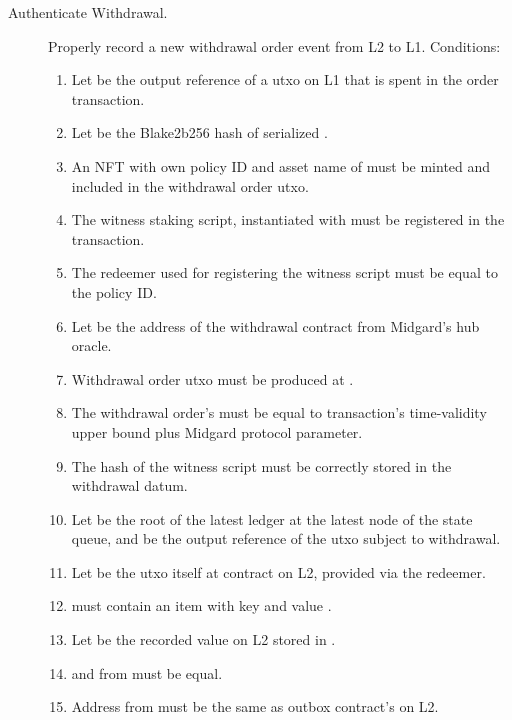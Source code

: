 \documentclass[../midgard.tex]{subfiles}
\begin{document}
\begin{description}
  \item[Authenticate Withdrawal.] Properly record a new withdrawal order event from L2 to L1.
    Conditions:
      \begin{enumerate}
        \item Let  be the output reference of a utxo on L1 that is spent in the order transaction.
        \item Let  be the Blake2b256 hash of serialized .
        \item An NFT with own policy ID and asset name of  must be minted and included in the withdrawal order utxo.
        \item The witness staking script, instantiated with  must be registered in the transaction.
        \item The redeemer used for registering the witness script must be equal to the  policy ID.
        \item Let  be the address of the withdrawal contract from Midgard's hub oracle.
        \item Withdrawal order utxo must be produced at .
        \item The withdrawal order's  must be equal to transaction's time-validity upper bound plus  Midgard protocol parameter.
        \item The hash of the witness script must be correctly stored in the withdrawal datum.
        \item Let  be the root of the latest ledger at the latest node of the state queue, and  be the output reference of the utxo subject to withdrawal.
        \item Let  be the utxo itself at  contract on L2, provided via the redeemer.
        \item {} must contain an item with key  and value .
        \item Let  be the recorded value on L2 stored in .
        \item {} and  from  must be equal.
        \item Address from  must be the same as outbox contract's on L2.
      \end{enumerate}

\end{description}
\end{document}
